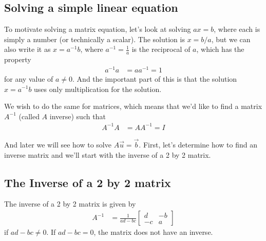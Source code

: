 \subsection{Solving a simple linear equation}

To motivate solving a matrix equation, let's look at solving $a x = b$, where each is simply a number (or technically a scalar).   The solution is $x=b/a$, but we can also write it as $x = a^{-1}b$, where $a^{-1}=\frac{1}{a}$ is the reciprocal of $a$, which has the property
%
\begin{align*}
a^{-1} a & = a a^{-1} = 1
\end{align*}
for any value of $a \neq 0$.  And the important part of this is that the solution $x=a^{-1}b$ uses only multiplication for the solution.

We wish to do the same for matrices, which means that we'd like to find a matrix $A^{-1}$ (called $A$ inverse)  such that
%
\begin{align*}
A^{-1} A &  = A A^{-1} = I
\end{align*}

And later we will see how to solve $A\vec{u}=\vec{b}$.  First, let's determine how to find an inverse matrix and we'll start with the inverse of a 2 by 2 matrix.

\subsection{The Inverse of a 2 by 2 matrix}


\begin{Boxed*}
The inverse of a 2 by 2 matrix is given by
%
\begin{align}
A^{-1} & = \frac{1}{ad-bc}
\begin{bmatrix}
d & -b \\ -c & a
\end{bmatrix} \label{eq:def:2by2:inverse}
\end{align}
%
if $ad-bc \neq 0$.  If $ad-bc =0$, the matrix does not have an inverse.
\end{Boxed*}


